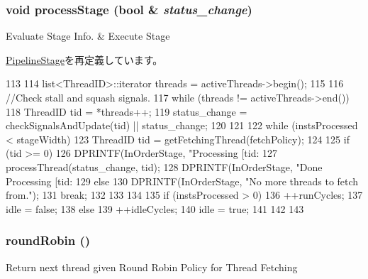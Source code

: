 \hypertarget{classFirstStage_a0782fca2c80ef367ee914d464584ab20}{
\subsubsection[{processStage}]{\setlength{\rightskip}{0pt plus 5cm}void processStage (bool \& {\em status\_\-change})}}
\label{classFirstStage_a0782fca2c80ef367ee914d464584ab20}
Evaluate Stage Info. \& Execute Stage 

\hyperlink{classPipelineStage_a0782fca2c80ef367ee914d464584ab20}{PipelineStage}を再定義しています。


\begin{DoxyCode}
113 {
114     list<ThreadID>::iterator threads = activeThreads->begin();
115 
116     //Check stall and squash signals.
117     while (threads != activeThreads->end()) {
118         ThreadID tid = *threads++;
119         status_change =  checkSignalsAndUpdate(tid) || status_change;
120     }
121 
122     while (instsProcessed < stageWidth)  {
123         ThreadID tid = getFetchingThread(fetchPolicy);
124 
125         if (tid >= 0) {
126             DPRINTF(InOrderStage, "Processing [tid:%
127             processThread(status_change, tid);
128             DPRINTF(InOrderStage, "Done Processing [tid:%
129         } else {
130             DPRINTF(InOrderStage, "No more threads to fetch from.\n");
131             break;
132         }
133     }
134 
135     if (instsProcessed > 0) {
136         ++runCycles;
137         idle = false;        
138     } else {
139         ++idleCycles;
140         idle = true;        
141     }
142 
143 }
\end{DoxyCode}
\hypertarget{classFirstStage_a8aab9cacbc483081596b13ecd5192eb5}{
\subsubsection[{roundRobin}]{ roundRobin ()}}
\label{classFirstStage_a8aab9cacbc483081596b13ecd5192eb5}
Return next thread given Round Robin Policy for Thread Fetching 


